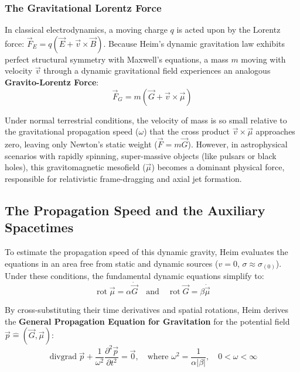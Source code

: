 \documentclass[11pt,a4paper,oneside]{article}
\begin{document}
\subsubsection{The Gravitational Lorentz Force}
In classical electrodynamics, a moving charge $q$ is acted upon by the Lorentz force: $\vec{F}_E = q(\vec{E} + \vec{v} \times \vec{B})$. Because Heim's dynamic gravitation law exhibits perfect structural symmetry with Maxwell's equations, a mass $m$ moving with velocity $\vec{v}$ through a dynamic gravitational field experiences an analogous \textbf{Gravito-Lorentz Force}:
\begin{equation}
    \vec{F}_G = m \left( \vec{G} + \vec{v} \times \vec{\mu} \right)
\end{equation}

Under normal terrestrial conditions, the velocity of mass is so small relative to the gravitational propagation speed ($\omega$) that the cross product $\vec{v} \times \vec{\mu}$ approaches zero, leaving only Newton's static weight ($\vec{F} = m\vec{G}$). However, in astrophysical scenarios with rapidly spinning, super-massive objects (like pulsars or black holes), this gravitomagnetic mesofield ($\vec{\mu}$) becomes a dominant physical force, responsible for relativistic frame-dragging and axial jet formation.

\subsection{The Propagation Speed and the Auxiliary Spacetimes}

To estimate the propagation speed of this dynamic gravity, Heim evaluates the equations in an area free from static and dynamic sources ($v = 0$, $\sigma \approx \sigma_{(0)}$). Under these conditions, the fundamental dynamic equations simplify to:
\begin{equation}
    \operatorname{rot}\vec{\mu} = \alpha\dot{\vec{G}} \quad \text{and} \quad \operatorname{rot}\vec{G} = \beta\dot{\vec{\mu}}
\end{equation}

By cross-substituting their time derivatives and spatial rotations, Heim derives the \textbf{General Propagation Equation for Gravitation} for the potential field $\vec{p} \hat{=} (\vec{G}, \vec{\mu})$:
\begin{equation}
    \operatorname{divgrad}\vec{p} + \frac{1}{\omega^2} \frac{\partial^2 \vec{p}}{\partial t^2} = \vec{0}, \quad \text{where } \omega^2 = \frac{1}{\alpha |\beta|}, \quad 0 < \omega < \infty
\end{equation}
\end{document}
